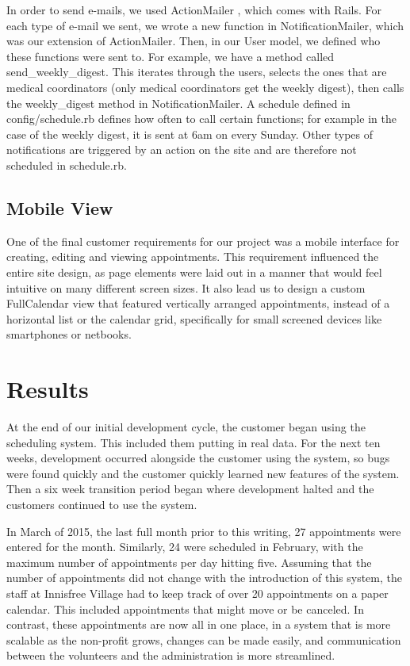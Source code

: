 \documentclass{sig-alternate}
\begin{document}
In order to send e-mails, we used ActionMailer \cite{actionmailer}, which comes with Rails.  For each type of e-mail we sent, we wrote a new function in NotificationMailer, which was our extension of ActionMailer.  Then, in our User model, we defined who these functions were sent to.  For example, we have a method called send\_weekly\_digest.   This iterates through the users, selects the ones that are medical coordinators (only medical coordinators get the weekly digest), then calls the weekly\_digest method in NotificationMailer.  A schedule defined in config/schedule.rb defines how often to call certain functions; for example in the case of the weekly digest, it is sent at 6am on every Sunday.  Other types of notifications are triggered by an action on the site and are therefore not scheduled in schedule.rb. 

\subsection{Mobile View}
One of the final customer requirements for our project was a mobile interface for creating, editing and viewing appointments. This requirement influenced the entire site design, as page elements were laid out in a manner that would feel intuitive on many different screen sizes. It also lead us to design a custom FullCalendar view that featured vertically arranged appointments, instead of a horizontal list or the calendar grid, specifically for small screened devices like smartphones or netbooks.

\section{Results}
At the end of our initial development cycle, the customer began using the scheduling system.  This included them putting in real data.  For the next ten weeks, development occurred alongside the customer using the system, so bugs were found quickly and the customer quickly learned new features of the system.  Then a six week transition period began where development halted and the customers continued to use the system.

In March of 2015, the last full month prior to this writing, 27 appointments were entered for the month.  Similarly, 24 were scheduled in February, with the maximum number of appointments per day hitting five.  Assuming that the number of appointments did not change with the introduction of this system, the staff at Innisfree Village had to keep track of over 20 appointments on a paper calendar.  This included appointments that might move or be canceled.  In contrast, these appointments are now all in one place, in a system that is more scalable as the non-profit grows, changes can be made easily, and communication between the volunteers and the administration is more streamlined.
\end{document}

